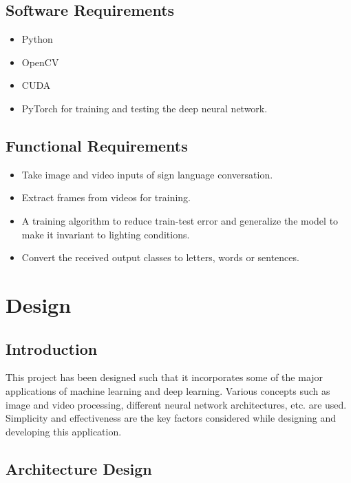 \documentclass[12pt,oneside,a4paper]{article}
\begin{document}
		\subsection{Software Requirements}

			\begin{itemize}
				\item Python
				\item OpenCV
				\item CUDA
				\item PyTorch for training and testing the deep neural network.
			\end{itemize}

		\subsection{Functional Requirements}

			\begin{itemize}
				\item Take image and video inputs of sign language conversation.
				\item Extract frames from videos for training.
				\item A training algorithm to reduce train-test error and generalize the model to make it invariant to lighting conditions.
				\item Convert the received output classes to letters, words or sentences.
			\end{itemize}

	\section{Design}

		\subsection{Introduction}
			This project has been designed such that it incorporates some of the major applications of machine learning and deep learning. Various concepts such as image and video processing, different neural network architectures, etc. are used. Simplicity and effectiveness are the key factors considered while designing and developing this application.

		\subsection{Architecture Design}
\end{document}
